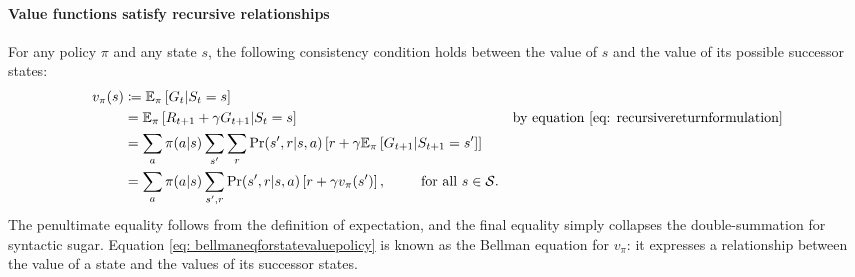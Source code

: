 \documentclass[12pt]{article}
\begin{document}
\paragraph{Value functions satisfy recursive relationships} For any policy $\pi$ and any state $s$, the following consistency condition holds between the value of $s$ and the value of its possible successor states:
\begin{align}
  v_\pi(s) &\coloneqq \mathbb E_\pi \left[ G_t | S_t = s \right] \nonumber \\
           &= \mathbb E_\pi \left[ R_{t+1} + \gamma G_{t+1} | S_t = s \right] &\textrm{by equation } \ref{eq: recursivereturnformulation} \nonumber  \\
           &= \sum_a \pi(a|s) \sum_{s'} \sum_{r} \Pr(s',r|s,a) \left[ r + \gamma                           \mathbb E_\pi \left[G_{t+1} | S_{t+1} = s' \right] \right] \nonumber  \\
  \label{eq: bellmaneqforstatevaluepolicy}
           &= \sum_a \pi(a|s) \sum_{s',r} \Pr(s',r|s,a) \left[r + \gamma v_\pi(s')\right], \hspace{25pt} \textrm{for all } s \in \mathcal S.
\end{align}
The penultimate equality follows from the definition of expectation, and the final equality simply collapses the double-summation for syntactic sugar.
Equation \ref{eq: bellmaneqforstatevaluepolicy} is known as the Bellman equation for $v_\pi$: it expresses a relationship between the value of a state and the values of its successor states.
\end{document}
